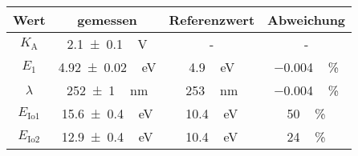 \label{tab:Ergebnisse}
	\begin{tabular}{c ccc}
		\toprule
		{Wert}&{gemessen}&{Referenzwert}&{Abweichung} \\
		\midrule
		$K_\text{A}$ & \SI{2.1\pm0.1}\,\si{\volt} & - & - \\
		$E_\text{1}$ & \SI{4.92\pm0.02}\,\si{\eV} & \SI{4.9}\,\si{\eV} & \SI{-0.004}\,\si{\percent} \\
		$\lambda$ & \SI{252\pm1}\,\si{\nano\metre} & \SI{253}\,\si{\nano\metre} & \SI{-0.004}\,\si{\percent} \\
		$E_\text{Io1}$ & \SI{15.6\pm0.4}\,\si{\eV} & \SI{10.4}\,\si{\eV} & \SI{50}\,\si{\percent} \\
		$E_\text{Io2}$ & \SI{12.9\pm0.4}\,\si{\eV} & \SI{10.4}\,\si{\eV} & \SI{24}\,\si{\percent} \\
		\bottomrule
	\end{tabular}
